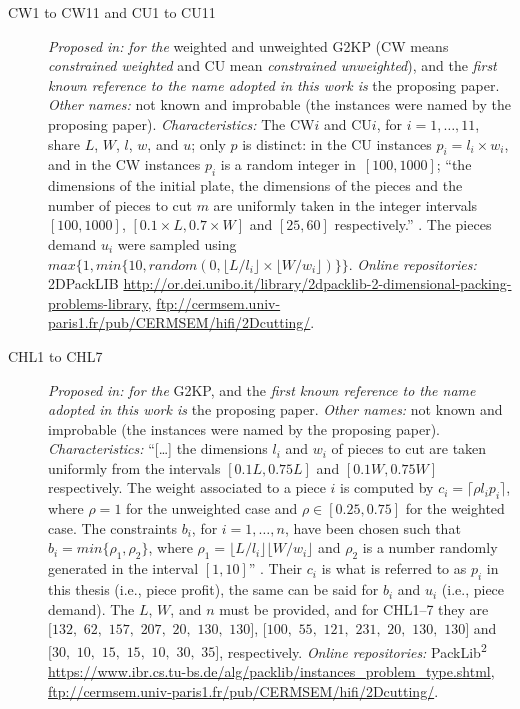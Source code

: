 \documentclass[ppgc,tese,english,formais,babel]{iiufrgs}
\begin{document}
\begin{description}
\item [CW1 to CW11 and CU1 to CU11] \emph{Proposed in:} \citet{fayard:1998} \emph{for the} weighted and unweighted G2KP (CW means \emph{constrained weighted} and CU mean \emph{constrained unweighted}), and the \emph{first known reference to the name adopted in this work is} the proposing paper. \emph{Other names:} not known and improbable (the instances were named by the proposing paper). \emph{Characteristics: } The CW\(i\) and CU\(i\), for \(i = 1, \dots, 11\), share \(L\), \(W\), \(l\), \(w\), and \(u\); only \(p\) is distinct: in the CU instances \(p_i = l_i \times w_i\), and in the CW instances \(p_i\) is a random integer in~\([100, 1000]\); ``the dimensions of the initial plate, the dimensions of the pieces and the number of pieces to cut \(m\) are uniformly taken in the integer intervals \([100, 1000]\), \([0.1 \times L, 0.7 \times W]\) and \([25, 60]\) respectively.'' \citep{fayard:1998}. The pieces demand \(u_i\) were sampled using~\(max\{1, min\{10, random(0, \lfloor L/l_i \rfloor \times \lfloor W/w_i \rfloor)\}\}\). \emph{Online repositories:} 2DPackLIB \url{http://or.dei.unibo.it/library/2dpacklib-2-dimensional-packing-problems-library}, \url{ftp://cermsem.univ-paris1.fr/pub/CERMSEM/hifi/2Dcutting/}.
\item [CHL1 to CHL7] \emph{Proposed in:} \citet{cung:2000} \emph{for the} G2KP, and the \emph{first known reference to the name adopted in this work is} the proposing paper. \emph{Other names: } not known and improbable (the instances were named by the proposing paper). \emph{Characteristics: } ``[\dots] the dimensions \(l_i\) and \(w_i\) of pieces to cut are taken uniformly from the intervals \([0.1L, 0.75L]\) and \([0.1W, 0.75W]\) respectively. The weight associated to a piece \(i\) is computed by \(c_i = \lceil\rho l_i p_i\rceil\), where \(\rho = 1\) for the unweighted case and \(\rho \in [0.25, 0.75]\) for the weighted case. The constraints \(b_i\), for \(i = 1, \dots, n\), have been chosen such that \(b_i = min\{\rho_1, \rho_2\}\), where \(\rho_1 = \lfloor L/l_i \rfloor\lfloor W/w_i \rfloor \) and \(\rho_2\) is a number randomly generated in the interval \([1, 10]\)'' \citep{cung:2000}. Their \(c_i\) is what is referred to as \(p_i\) in this thesis (i.e., piece profit), the same can be said for \(b_i\) and \(u_i\) (i.e., piece demand). The \(L\), \(W\), and \(n\) must be provided, and for CHL1--7 they are \([132,\) \(62,\) \(157,\) \(207,\) \(20,\) \(130,\) \(130]\), \([100,\) \(55,\) \(121,\) \(231,\) \(20,\) \(130,\) \(130]\) and \([30,\) \(10,\) \(15,\) \(15,\) \(10,\) \(30,\) \(35]\), respectively. \emph{Online repositories:} PackLib\textsuperscript{2} \url{https://www.ibr.cs.tu-bs.de/alg/packlib/instances_problem_type.shtml}, \url{ftp://cermsem.univ-paris1.fr/pub/CERMSEM/hifi/2Dcutting/}.

\end{description}
\end{document}

